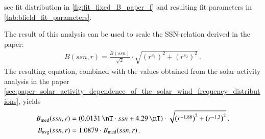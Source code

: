 see fit distribution in \autoref{fig:fit_fixed_B_paper_f} and resulting fit parameters in \autoref{tab:bfield_fit_parameters}.\\
\begin{figure}[htb]
\end{figure}


The result of this analysis can be used to scale the SSN-relation derived in the paper:
\begin{align}
	B(ssn,r) = \frac{B(ssn)}{\sqrt{2}} \cdot \sqrt{\left(r^{e_1}\right)^2 + \left(r^{e_2}\right)^2}	\,.
\end{align}
The resulting equation, combined with the values obtained from the solar activity analysis in the paper \autoref{sec:paper_solar_activity_dependence_of_the_solar_wind_frequency_distributions}, yields
\begin{align}
	B_\text{med}(ssn,r) &= \left(\SI{0.0131}{\nT} \cdot ssn + \SI{4.29}{\nT}\right) \cdot \sqrt{\left(r^{-1.86}\right)^2 + \left(r^{-1.3}\right)^2}	\,,\\
	B_\text{avg}(ssn,r) &= 1.0879 \cdot B_\text{med}(ssn,r)\,.
\end{align}


